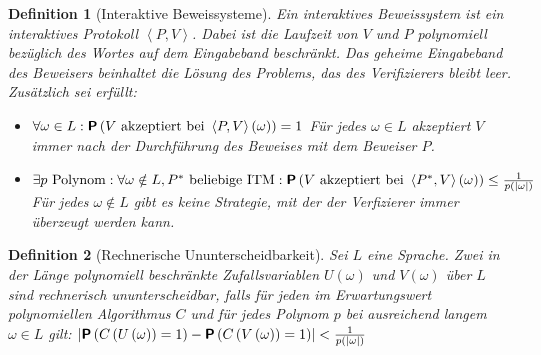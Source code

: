 \documentclass[12pt,a4paper,bibliography=totocnumbered,listof=totocnumbered]{scrartcl}
\newtheorem{definition}{Definition}
\begin{document}
\begin{definition}[Interaktive Beweissysteme]
\label{definition:proofsystem}
Ein interaktives Beweissystem ist ein interaktives Protokoll 
\( \left< P, V\right> \). Dabei ist die Laufzeit von \( V \) und \( P \) polynomiell bezüglich des Wortes auf dem Eingabeband beschränkt. Das geheime Eingabeband des Beweisers beinhaltet die Lösung des Problems, das des Verifizierers bleibt leer. Zusätzlich sei erfüllt:
\begin{itemize}

\item[\textnormal{Vollständigkeit:}] \( \forall \omega \in L : \textnormal{\textbf{\textsf{P}}} \left( V \textnormal{ akzeptiert bei } \left< P, V \right> \left( \omega \right) \right) = 1 \)  \glqq{}Für jedes \( \omega \in L \) akzeptiert \( V \) immer nach der Durchführung des Beweises mit dem Beweiser \( P \).\grqq{}

\item[\textnormal{Korrektheit:}] \( \exists p \textnormal{ Polynom}: \forall \omega \notin L, P^{\ast} \textnormal{ beliebige ITM} : \textnormal{\textbf{\textsf{P}}} \left( V \textnormal{ akzeptiert bei } \left< P ^{\ast}, V \right> \left( \omega \right) \right) \leq \frac{1}{p \left( \left| \omega \right| \right)}  \) \glqq{}Für jedes \( \omega \notin L \) gibt es keine Strategie, mit der der Verfizierer \glqq{}immer\grqq{} überzeugt werden kann.\grqq{}
\end{itemize}
\end{definition}

\begin{definition}[Rechnerische Ununterscheidbarkeit] Sei \( L \) eine Sprache.
Zwei in der Länge polynomiell beschränkte Zufallsvariablen \( U \left( \omega \right) \) und \( V \left( \omega \right) \) über \( L \) sind rechnerisch ununterscheidbar, falls für jeden im Erwartungswert polynomiellen Algorithmus \( C \) und für jedes Polynom \( p \) bei ausreichend langem \( \omega \in L \) gilt:
\( \left| \textnormal{\textbf{\textsf{P}}} \left( C \left( U \left( \omega \right) \right) = 1 \right) - \textnormal{\textbf{\textsf{P}}} \left( C \left( V \left( \omega \right) \right) = 1 \right) \right| < \frac{1}{p \left( \left| \omega \right| \right)} \)
\end{definition}
\end{document}
